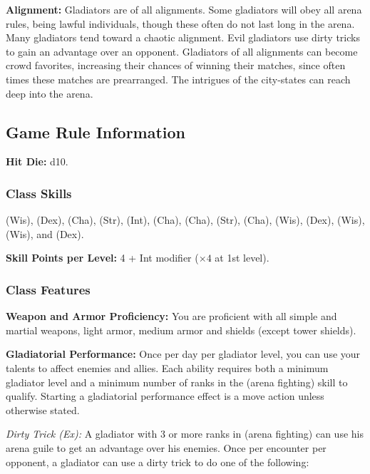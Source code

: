 \textbf{Alignment:} Gladiators are of all alignments. Some gladiators will obey all arena rules, being lawful individuals, though these often do not last long in the arena. Many gladiators tend toward a chaotic alignment. Evil gladiators use dirty tricks to gain an advantage over an opponent. Gladiators of all alignments can become crowd favorites, increasing their chances of winning their matches, since often times these matches are prearranged. The intrigues of the city-states can reach deep into the arena.

\subsection{Game Rule Information}

\textbf{Hit Die:} d10.

\subsubsection{Class Skills}
 (Wis),  (Dex),  (Cha),  (Str),  (Int),  (Cha),  (Cha),  (Str),  (Cha),  (Wis),  (Dex),  (Wis),  (Wis), and  (Dex).

\textbf{Skill Points per Level:} 4 + Int modifier ($\times4$ at 1st level).

\subsubsection{Class Features}

\textbf{Weapon and Armor Proficiency:} You are proficient with all simple and martial weapons, light armor, medium armor and shields (except tower shields).

\textbf{Gladiatorial Performance:} Once per day per gladiator level, you can use your talents to affect enemies and allies. Each ability requires both a minimum gladiator level and a minimum number of ranks in the  (arena fighting) skill to qualify. Starting a gladiatorial performance effect is a move action unless otherwise stated.

\textit{Dirty Trick (Ex):} A gladiator with 3 or more ranks in  (arena fighting) can use his arena guile to get an advantage over his enemies. Once per encounter per opponent, a gladiator can use a dirty trick to do one of the following:

